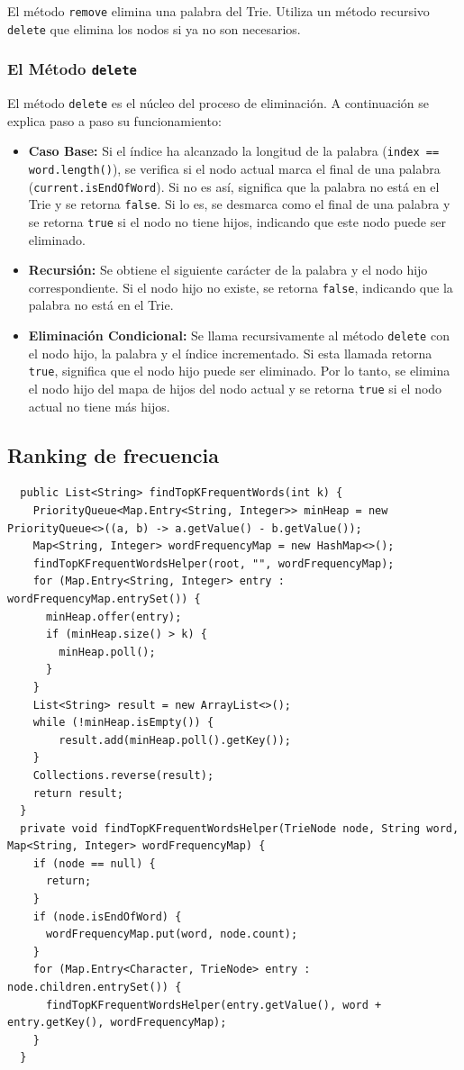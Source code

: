\documentclass[11pt, a4paper]{article}
\begin{document}
El método \texttt{remove} elimina una palabra del Trie. Utiliza un método recursivo \texttt{delete} que elimina los nodos si ya no son necesarios. 

\subsubsection{El Método \texttt{delete}}
El método \texttt{delete} es el núcleo del proceso de eliminación. A continuación se explica paso a paso su funcionamiento:

\begin{itemize}
  \item \textbf{Caso Base:} Si el índice ha alcanzado la longitud de la palabra (\texttt{index == word.length()}), se verifica si el nodo actual marca el final de una palabra (\texttt{current.isEndOfWord}). Si no es así, significa que la palabra no está en el Trie y se retorna \texttt{false}. Si lo es, se desmarca como el final de una palabra y se retorna \texttt{true} si el nodo no tiene hijos, indicando que este nodo puede ser eliminado.
  \item \textbf{Recursión:} Se obtiene el siguiente carácter de la palabra y el nodo hijo correspondiente. Si el nodo hijo no existe, se retorna \texttt{false}, indicando que la palabra no está en el Trie.
  \item \textbf{Eliminación Condicional:} Se llama recursivamente al método \texttt{delete} con el nodo hijo, la palabra y el índice incrementado. Si esta llamada retorna \texttt{true}, significa que el nodo hijo puede ser eliminado. Por lo tanto, se elimina el nodo hijo del mapa de hijos del nodo actual y se retorna \texttt{true} si el nodo actual no tiene más hijos.
\end{itemize}

\subsection{Ranking de frecuencia}

\begin{verbatim}
  public List<String> findTopKFrequentWords(int k) {
    PriorityQueue<Map.Entry<String, Integer>> minHeap = new PriorityQueue<>((a, b) -> a.getValue() - b.getValue());
    Map<String, Integer> wordFrequencyMap = new HashMap<>();
    findTopKFrequentWordsHelper(root, "", wordFrequencyMap);
    for (Map.Entry<String, Integer> entry : wordFrequencyMap.entrySet()) {
      minHeap.offer(entry);
      if (minHeap.size() > k) {
        minHeap.poll();
      }
    }
    List<String> result = new ArrayList<>();
    while (!minHeap.isEmpty()) {
        result.add(minHeap.poll().getKey());
    }
    Collections.reverse(result);
    return result;
  }
  private void findTopKFrequentWordsHelper(TrieNode node, String word, Map<String, Integer> wordFrequencyMap) {
    if (node == null) {
      return;
    }
    if (node.isEndOfWord) {
      wordFrequencyMap.put(word, node.count);
    }
    for (Map.Entry<Character, TrieNode> entry : node.children.entrySet()) {
      findTopKFrequentWordsHelper(entry.getValue(), word + entry.getKey(), wordFrequencyMap);
    }
  }
\end{verbatim}
\end{document}
